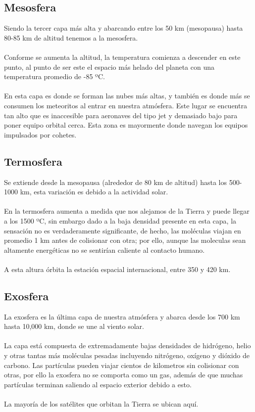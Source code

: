 \documentclass{article}
\begin{document}
    \subsection{Mesosfera}
    
    Siendo la tercer capa más alta y abarcando entre los 50 km (mesopausa)         hasta 80-85 km de altitud tenemos a la mesosfera.
    \\
    \\ Conforme se aumenta la altitud, la temperatura comienza a descender en       este punto, al punto de ser este el espacio más helado del planeta con una     temperatura promedio de -85 ºC.
    \\
    \\ En esta capa es donde se forman las nubes más altas, y también es donde     más se consumen los meteoritos al entrar en nuestra atmósfera. Este lugar       se encuentra tan alto que es inaccesible para aeronaves del tipo jet y         demasiado bajo para poner equipo orbital cerca. Esta zona es mayormente         donde navegan los equipos impulsados por cohetes.
    
    \subsection{Termosfera}
    
    Se extiende desde la mesopausa (alrededor de 80 km de altitud) hasta los       500-1000 km, esta variación es debido a la actividad solar.
    \\
    \\ En la termosfera aumenta a medida que nos alejamos de la Tierra y puede     llegar a los 1500 ºC, sin embargo dado a la baja densidad presente en esta     capa, la sensación no es verdaderamente significante, de hecho, las             moléculas viajan en promedio 1 km antes de colisionar con otra; por ello,       aunque las moleculas sean altamente energéticas no se sentirían caliente       al  contacto humano.
    \\
    \\ A esta altura órbita la estación espacial internacional, entre 350 y 420     km.
    
    \subsection{Exosfera}
    
    La exosfera es la última capa de nuestra atmósfera y abarca desde los 700       km hasta 10,000 km, donde se une al viento solar.
    \\
    \\ La capa está compuesta de extremadamente bajas densidades de hidrógeno,     helio y otras tantas más moléculas pesadas incluyendo nitrógeno, oxígeno y     dióxido de carbono. Las partículas pueden viajar cientos de kilometros sin     colisionar con otras, por ello la exosfera no se comporta como un gas,         además de que muchas partículas terminan saliendo al espacio exterior           debido a esto.
    \\
    \\ La mayoría de los satélites que orbitan la Tierra se ubican aquí.
\end{document}
